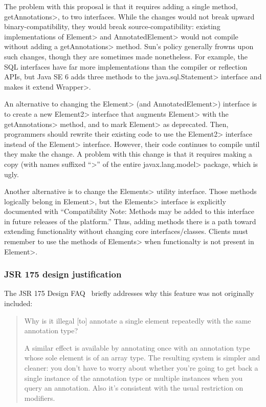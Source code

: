 \documentclass[10pt]{article}
\begin{document}
The problem with this proposal is that it requires adding a single method,
\<getAnnotations>, to two interfaces.  While the changes would not break
upward binary-compatibility, they would break source-compatibility:
existing implementations of \<Element> and \<AnnotatedElement> would not
compile without adding a \<getAnnotations> method.  Sun's policy generally
frowns upon such changes, though they are sometimes made nonetheless.
For example, the
SQL interfaces have far more implementations than the compiler or
reflection APIs, but Java SE 6 adds three methods to the
\<java.sql.Statement> interface and makes it extend \<Wrapper>.

An alternative to changing the \<Element> (and \<AnnotatedElement>) interface is to create a new
\<Element2> interface that augments \<Element> with the \<getAnnotations>
method, and to mark \<Element> as deprecated.  Then, programmers should
rewrite their existing code to use the \<Element2> interface instead of the
\<Element> interface.  However, their code continues to compile until they
make the change.  A problem with this change is that it requires making a
copy (with names suffixed ``>'' of the entire \<javax.lang.model>
package, which is ugly.

Another alternative is to change the \<Elements> utility interface.  Those
methods logically belong in \<Element>, but the \<Elements> interface is
explicitly documented with ``Compatibility Note: Methods may be added to
this interface in future releases of the platform.''  Thus, adding methods
there is a path toward extending functionality without changing core
interfaces/classes.  Clients must remember to use the methods of \<Elements>
when functionalty is not present in \<Element>.


\subsubsection{JSR 175 design justification}

The JSR 175 Design FAQ~\cite{JSR175-PFD2} briefly addresses why this
feature was not originally included:

\begin{quote}
Why is it illegal [to] annotate a single element repeatedly with the same annotation type?

A similar effect is available by annotating once with an annotation type
whose sole element is of an array type. The resulting system is simpler and
cleaner: you don't have to worry about whether you're going to get back a
single instance of the annotation type or multiple instances when you query
an annotation. Also it's consistent with the usual restriction on
modifiers.
\end{quote}
\end{document}

